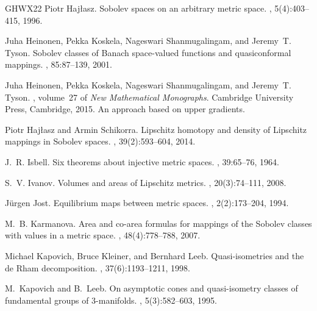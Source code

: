 \documentclass[a4paper,leqno]{amsart}
\numberwithin{equation}{section}
\theoremstyle{remark}
\theoremstyle{remark}
\begin{document}
\begin{thebibliography}{GHWX22}
Piotr Haj{\l}asz.
\newblock Sobolev spaces on an arbitrary metric space.
, 5(4):403--415, 1996.

Juha Heinonen, Pekka Koskela, Nageswari Shanmugalingam, and Jeremy~T. Tyson.
\newblock Sobolev classes of {B}anach space-valued functions and quasiconformal mappings.
, 85:87--139, 2001.

Juha Heinonen, Pekka Koskela, Nageswari Shanmugalingam, and Jeremy~T. Tyson.
, volume~27 of {\em New Mathematical Monographs}.
\newblock Cambridge University Press, Cambridge, 2015.
\newblock An approach based on upper gradients.

Piotr Haj{\l}asz and Armin Schikorra.
\newblock Lipschitz homotopy and density of {L}ipschitz mappings in {S}obolev spaces.
, 39(2):593--604, 2014.

J.~R. Isbell.
\newblock Six theorems about injective metric spaces.
, 39:65--76, 1964.

S.~V. Ivanov.
\newblock Volumes and areas of {L}ipschitz metrics.
, 20(3):74--111, 2008.

J\"urgen Jost.
\newblock Equilibrium maps between metric spaces.
, 2(2):173--204, 1994.

M.~B. Karmanova.
\newblock Area and co-area formulas for mappings of the {S}obolev classes with values in a metric space.
, 48(4):778--788, 2007.

Michael Kapovich, Bruce Kleiner, and Bernhard Leeb.
\newblock Quasi-isometries and the de {R}ham decomposition.
, 37(6):1193--1211, 1998.

M.~Kapovich and B.~Leeb.
\newblock On asymptotic cones and quasi-isometry classes of fundamental groups of {$3$}-manifolds.
, 5(3):582--603, 1995.


\end{thebibliography}
\end{document}
